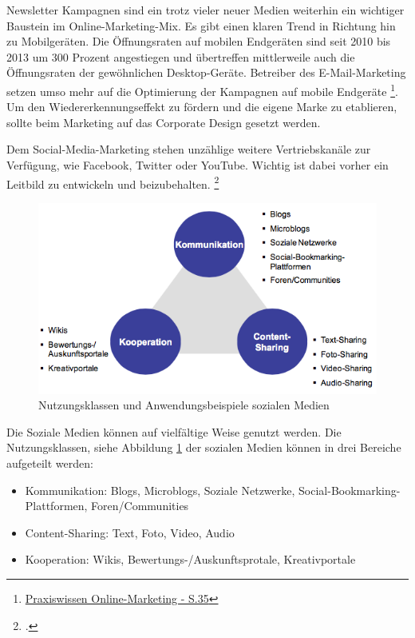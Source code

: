 Newsletter Kampagnen sind ein trotz vieler neuer Medien weiterhin ein wichtiger Baustein im Online-Marketing-Mix. Es gibt einen klaren Trend in Richtung hin zu Mobilgeräten. Die Öffnungsraten auf mobilen Endgeräten sind seit 2010 bis 2013 um 300 Prozent angestiegen und übertreffen mittlerweile auch die Öffnungsraten der gewöhnlichen Desktop-Geräte. Betreiber des E-Mail-Marketing setzen umso mehr auf die Optimierung der Kampagnen auf mobile Endgeräte \footnote{\url{Praxiswissen Online-Marketing - S.35}}. Um den Wiedererkennungseffekt zu fördern und die eigene Marke zu etablieren, sollte beim Marketing auf das Corporate Design gesetzt werden.

Dem Social-Media-Marketing stehen unzählige weitere Vertriebskanäle zur Verfügung, wie Facebook, 
Twitter oder YouTube. Wichtig ist dabei vorher ein Leitbild zu entwickeln und beizubehalten. 
\footcite[8]{hsmerseburg_masterkonzept_2009}

\begin{figure}[h!]
	\centering
	\includegraphics[width=\textwidth]{kapitel/gruppe1_2/bilder/nutzungsklassen}
	\caption{Nutzungsklassen und Anwendungsbeispiele sozialen Medien\protect\footnotemark}
	\label{fig_nutzungsklassen}
\end{figure}

Die Soziale Medien können auf vielfältige Weise genutzt werden. Die Nutzungsklassen, siehe Abbildung \ref{fig_nutzungsklassen} der sozialen Medien können in drei Bereiche aufgeteilt werden:


\begin{itemize}
	\item Kommunikation: Blogs, Microblogs, Soziale Netzwerke, Social-Bookmarking-Plattformen, Foren/Communities
	\item Content-Sharing: Text, Foto, Video, Audio
	\item Kooperation: Wikis, Bewertungs-/Auskunftsprotale, Kreativportale
\end{itemize}

